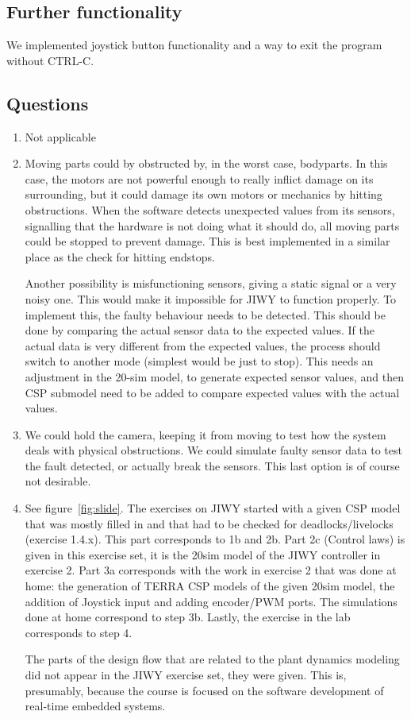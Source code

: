 \documentclass[a4paper,twoside,11pt]{article}
\begin{document}
\subsection{Further functionality}
We implemented joystick button functionality and a way to exit the program without CTRL-C.

\subsection{Questions}
\begin{enumerate}
	\item Not applicable
	\item Moving parts could by obstructed by, in the worst case, bodyparts. In this case, the motors are not powerful enough to really inflict damage on its surrounding, but it could damage its own motors or mechanics by hitting obstructions. When the software detects unexpected values from its sensors, signalling that the hardware is not doing what it should do, all moving parts could be stopped to prevent damage. This is best implemented in a similar place as the check for hitting endstops.
	
	Another possibility is misfunctioning sensors, giving a static signal or a very noisy one. This would make it impossible for JIWY to function properly. To implement this, the faulty behaviour needs to be detected. This should be done by comparing the actual sensor data to the expected values. If the actual data is very different from the expected values, the process should switch to another mode (simplest would be just to stop). This needs an adjustment in the 20-sim model, to generate expected sensor values, and then CSP submodel need to be added to compare expected values with the actual values.
	
	\item We could hold the camera, keeping it from moving to test how the system deals with physical obstructions. We could simulate faulty sensor data to test the fault detected, or actually break the sensors. This last option is of course not desirable.
	
	\item See figure~\ref{fig:slide}. The exercises on JIWY started with a given CSP model that was mostly filled in and that had to be checked for deadlocks/livelocks (exercise 1.4.x). This part corresponds to 1b and 2b. Part 2c (Control laws) is given in this exercise set, it is the 20sim model of the JIWY controller in exercise 2. Part 3a corresponds with the work in exercise 2 that was done at home: the generation of TERRA CSP models of the given 20sim model, the addition of Joystick input and adding encoder/PWM ports. The simulations done at home correspond to step 3b. Lastly, the exercise in the lab corresponds to step 4.

	The parts of the design flow that are related to the plant dynamics modeling did not appear in the  JIWY exercise set, they were given. This is, presumably, because the course is focused on the software development of real-time embedded systems. 
\end{enumerate}
\end{document}
